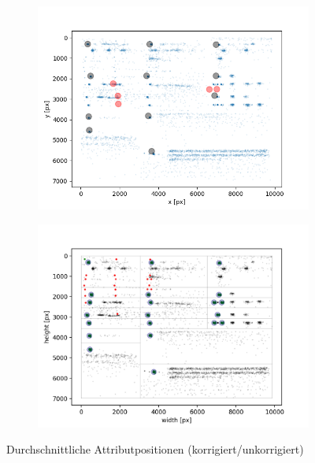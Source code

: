 \begin{figure}[H]
\centering
	\begin{subfigure}[t]{0.47\textwidth}
	\begin{flushright}
		\includegraphics[scale=0.5]{Bilder/ocr_attributes_1.png}
	\end{flushright}
	\end{subfigure}
	\begin{subfigure}[t]{0.47\textwidth}
	\begin{flushleft}
		\includegraphics[scale=0.5]{Bilder/ocr_attributes_2.png}
	\end{flushleft}
	\end{subfigure}
\caption{Durchschnittliche Attributpositionen (korrigiert/unkorrigiert)} 
\end{figure}


